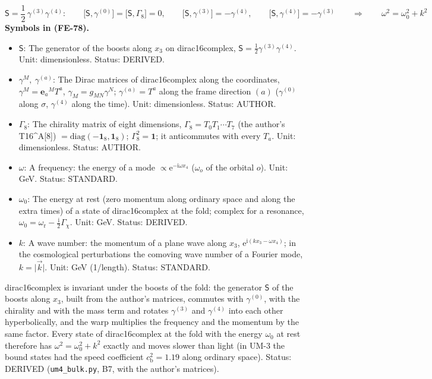 \documentclass[
  10pt,
]{article}
\providecommand{\tightlist}{%
  \setlength{\itemsep}{0pt}\setlength{\parskip}{0pt}}
\begin{document}
\[
\mathsf{S} = \frac12\,\gamma^{(3)}\gamma^{(4)}:\qquad
\big[\mathsf{S}, \gamma^{(0)}\big] = \big[\mathsf{S}, \Gamma_8\big] = 0,\qquad
\big[\mathsf{S}, \gamma^{(3)}\big] = -\gamma^{(4)},\qquad \big[\mathsf{S}, \gamma^{(4)}\big] = -\gamma^{(3)}\qquad\Rightarrow\qquad
\omega^2 = \omega_0^2 + k^2 \tag{FE-78}
\] \textbf{Symbols in (FE-78).}

\begin{itemize}
\tightlist
\item
  \(\mathsf{S}\): The generator of the boosts along \(x_3\) on
  dirac16complex, \(\mathsf{S} = \frac12\gamma^{(3)}\gamma^{(4)}\).
  Unit: dimensionless. Status: DERIVED.
\item
  \(\gamma^M,\ \gamma^{(a)}\): The Dirac matrices of dirac16complex
  along the coordinates, \(\gamma^M = \mathbf{e}_a{}^MT^a\),
  \(\gamma_M = g_{MN}\gamma^N\); \(\gamma^{(a)} = T^a\) along the frame
  direction \((a)\) (\(\gamma^{(0)}\) along \(\sigma\), \(\gamma^{(4)}\)
  along the time). Unit: dimensionless. Status: AUTHOR.
\item
  \(\Gamma_8\): The chirality matrix of eight dimensions,
  \(\Gamma_8 = T_0T_1\cdots T_7\) (the author's T16\^{}A{[}8{]})
  \(= \mathrm{diag}(-\mathbf{1}_8, \mathbf{1}_8)\);
  \(\Gamma_8^2 = \mathbf{1}\); it anticommutes with every \(T_a\). Unit:
  dimensionless. Status: AUTHOR.
\item
  \(\omega\): A frequency: the energy of a mode
  \(\propto \mathrm{e}^{-\mathrm{i}\omega x_4}\) (\(\omega_o\) of the
  orbital \(o\)). Unit: GeV. Status: STANDARD.
\item
  \(\omega_0\): The energy at rest (zero momentum along ordinary space
  and along the extra times) of a state of dirac16complex at the fold;
  complex for a resonance,
  \(\omega_0 = \omega_{\mathrm{r}} - \frac{\mathrm{i}}{2}\Gamma_\chi\).
  Unit: GeV. Status: DERIVED.
\item
  \(k\): A wave number: the momentum of a plane wave along \(x_3\),
  \(\mathrm{e}^{\mathrm{i}(kx_3 - \omega x_4)}\); in the cosmological
  perturbations the comoving wave number of a Fourier mode,
  \(k = \lvert\vec k\rvert\). Unit: GeV (1/length). Status: STANDARD.
\end{itemize}

dirac16complex is invariant under the boosts of the fold: the generator
\(\mathsf{S}\) of the boosts along \(x_3\), built from the author's
matrices, commutes with \(\gamma^{(0)}\), with the chirality and with
the mass term and rotates \(\gamma^{(3)}\) and \(\gamma^{(4)}\) into
each other hyperbolically, and the warp multiplies the frequency and the
momentum by the same factor. Every state of dirac16complex at the fold
with the energy \(\omega_0\) at rest therefore has
\(\omega^2 = \omega_0^2 + k^2\) exactly and moves slower than light (in
UM-3 the bound states had the speed coefficient
\(c_{\mathrm{b}}^2 = 1.19\) along ordinary space). Status: DERIVED
(\texttt{um4\_bulk.py}, B7, with the author's matrices).
\end{document}
